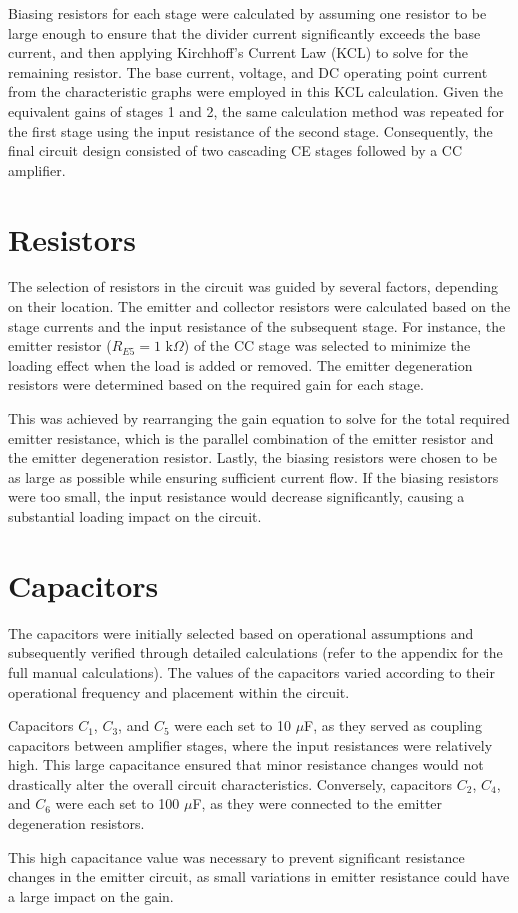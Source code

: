 {Biasing resistors for each stage were calculated by assuming one resistor to be large enough to ensure that the divider current significantly exceeds the base current, and then applying Kirchhoff's Current Law (KCL) to solve for the remaining resistor. The base current, voltage, and DC operating point current from the characteristic graphs were employed in this KCL calculation. Given the equivalent gains of stages 1 and 2, the same calculation method was repeated for the first stage using the input resistance of the second stage. Consequently, the final circuit design consisted of two cascading CE stages followed by a CC amplifier.}

\section{Resistors}

{The selection of resistors in the circuit was guided by several factors, depending on their location. The emitter and collector resistors were calculated based on the stage currents and the input resistance of the subsequent stage. For instance, the emitter resistor (\(R_{E5} = 1 \text{ k}\Omega\)) of the CC stage was selected to minimize the loading effect when the load is added or removed. The emitter degeneration resistors were determined based on the required gain for each stage.}

{This was achieved by rearranging the gain equation to solve for the total required emitter resistance, which is the parallel combination of the emitter resistor and the emitter degeneration resistor. Lastly, the biasing resistors were chosen to be as large as possible while ensuring sufficient current flow. If the biasing resistors were too small, the input resistance would decrease significantly, causing a substantial loading impact on the circuit.}

\section{Capacitors}

{The capacitors were initially selected based on operational assumptions and subsequently verified through detailed calculations (refer to the appendix for the full manual calculations). The values of the capacitors varied according to their operational frequency and placement within the circuit.}

{Capacitors \(C_1\), \(C_3\), and \(C_5\) were each set to 10 \(\mu\)F, as they served as coupling capacitors between amplifier stages, where the input resistances were relatively high. This large capacitance ensured that minor resistance changes would not drastically alter the overall circuit characteristics. Conversely, capacitors \(C_2\), \(C_4\), and \(C_6\) were each set to 100 \(\mu\)F, as they were connected to the emitter degeneration resistors.}

{This high capacitance value was necessary to prevent significant resistance changes in the emitter circuit, as small variations in emitter resistance could have a large impact on the gain.}
